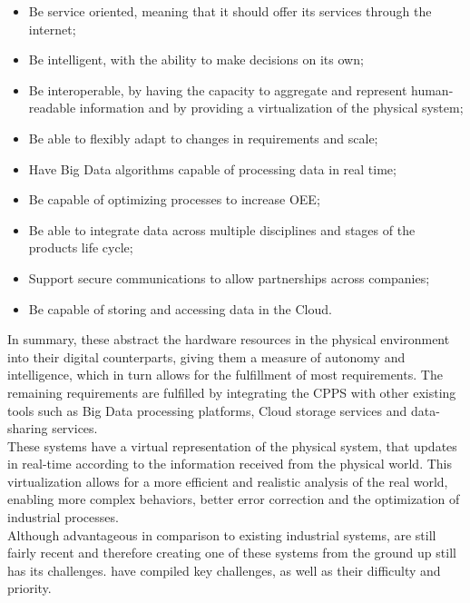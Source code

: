 \begin{itemize}
	\itemsep0em
	\item Be service oriented, meaning that it should offer its services through the internet;
	\item Be intelligent, with the ability to make decisions on its own;
	\item Be interoperable, by having the capacity to aggregate and represent human-readable information and by providing a virtualization of the physical system;
	\item Be able to flexibly adapt to changes in requirements and scale;
	\item Have Big Data algorithms capable of processing data in real time;
	\item Be capable of optimizing processes to increase \acrfull{OEE};
	\item Be able to integrate data across multiple disciplines and stages of the products life cycle;
	\item Support secure communications to allow partnerships across companies;
	\item Be capable of storing and accessing data in the Cloud.
\end{itemize}

In summary, these  abstract the hardware resources in the physical environment into their digital counterparts, giving them a measure of autonomy and intelligence, which in turn allows for the fulfillment of most requirements. The remaining requirements are fulfilled by integrating the \acrshort{CPPS} with other existing tools such as Big Data processing platforms, Cloud storage services and data-sharing services. \\

These systems have a virtual representation of the physical system, that updates in real-time according to the information received from the physical world. This virtualization allows for a more efficient and realistic analysis of the real world, enabling more complex behaviors, better error correction and the optimization of industrial processes.\\

Although advantageous in comparison to existing industrial systems,  are still fairly recent and therefore creating one of these systems from the ground up still has its challenges. \citeauthor{LEITAO201611} \cite{LEITAO201611} have compiled key challenges, as well as their difficulty and priority.\\

